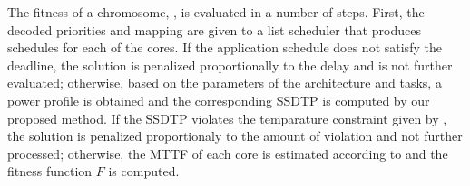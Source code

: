 The fitness of a chromosome, , is evaluated in a number of steps. First, the decoded priorities and mapping are given to a list scheduler that produces schedules for each of the cores. If the application schedule does not satisfy the deadline, the solution is penalized proportionally to the delay and is not further evaluated; otherwise, based on the parameters of the architecture and tasks, a power profile is obtained and the corresponding SSDTP is computed by our proposed method. If the SSDTP violates the temparature constraint given by , the solution is penalized proportionaly to the amount of violation and not further processed; otherwise, the MTTF of each core is estimated according to  and the fitness function $F$ is computed.
